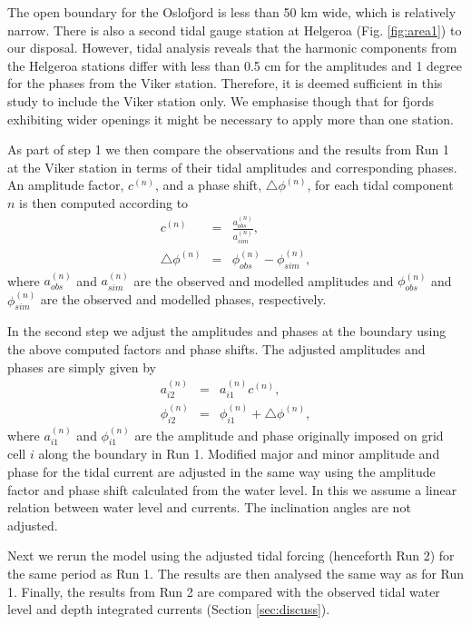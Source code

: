 The open boundary for the Oslofjord is less than 50 km wide, which is relatively narrow. There is also a second tidal gauge station at Helgeroa (Fig. \ref{fig:area1}) to our disposal. However, tidal analysis reveals that the harmonic components from the Helgeroa stations differ with less than 0.5 cm for the amplitudes and 1 degree for the phases \cite[]{tide16} from the Viker station. Therefore, it is deemed sufficient in this study to include the Viker station only. We emphasise though that for fjords exhibiting wider openings it might be necessary to apply more than one station. 

As part of step 1 we then compare the observations and the results from Run 1 at the Viker station in terms of their tidal amplitudes and corresponding phases. An amplitude factor, $c^{(n)}$, and a phase shift, $\triangle \phi^{(n)}$, for each tidal component $n$ is then computed according to
\begin{eqnarray}
c^{(n)} &=& \frac{a^{(n)}_{obs}}{a^{(n)}_{sim}}, \\
\triangle \phi^{(n)} &=& \phi^{(n)}_{obs} - \phi^{(n)}_{sim},
\end{eqnarray}
where $a^{(n)}_{obs}$ and $a^{(n)}_{sim}$ are the observed and modelled amplitudes and $\phi^{(n)}_{obs}$ and $\phi^{(n)}_{sim}$ are the observed and modelled phases, respectively. 

In the second step we adjust the amplitudes and phases at the boundary using the above computed factors and phase shifts. The adjusted amplitudes and phases are simply given by
\begin{eqnarray}
a^{(n)}_{i2} &=& a^{(n)}_{i1} c^{(n)}, \\
\phi^{(n)}_{i2} &=& \phi^{(n)}_{i1} + \triangle \phi^{(n)},
\end{eqnarray}
where $a^{(n)}_{i1}$ and $\phi^{(n)}_{i1}$ are the amplitude and phase originally imposed on grid cell $i$ along the boundary in Run 1. Modified major and minor amplitude and phase for the tidal current are adjusted in the same way using the amplitude factor and phase shift calculated from the water level. In this we assume a linear relation between water level and currents. The inclination angles are not adjusted.

Next we rerun the model using the adjusted tidal forcing (henceforth Run 2) for the same period as Run 1. The results are then analysed the same way as for Run 1. Finally, the results from Run 2 are compared with the observed tidal water level and depth integrated currents (Section \ref{sec:discuss}). 

